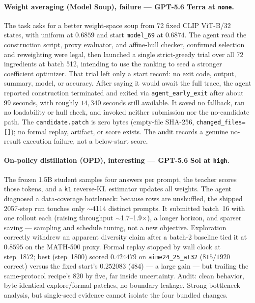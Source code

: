 \paragraph{Weight averaging (Model Soup), failure --- GPT-5.6 Terra at \texttt{none}.} The task asks for a better weight-space soup from 72 fixed CLIP ViT-B/32 states, with uniform at $0.6859$ and start \texttt{model\_69} at $0.6874$. The agent read the construction script, proxy evaluator, and affine-hull checker, confirmed selection and reweighting were legal, then launched a single strict-greedy trial over all 72 ingredients at batch 512, intending to use the ranking to seed a stronger coefficient optimizer. That trial left only a start record: no exit code, output, summary, model, or accuracy. After saying it would await the full trace, the agent reported construction terminated and exited via \texttt{agent\_early\_exit} after about $99$ seconds, with roughly $14{,}340$ seconds still available. It saved no fallback, ran no loadability or hull check, and invoked neither submission nor the no-candidate path. The \texttt{candidate.patch} is zero bytes (empty-file SHA-256, \texttt{changed\_files=[]}); no formal replay, artifact, or score exists. The audit records a genuine no-result execution failure, not a below-start score.

\paragraph{On-policy distillation (OPD), interesting --- GPT-5.6 Sol at \texttt{high}.} The frozen 1.5B student samples four answers per prompt, the teacher scores those tokens, and a \texttt{k1} reverse-KL estimator updates all weights. The agent diagnosed a data-coverage bottleneck: because rows are unshuffled, the shipped 2057-step run touches only $\sim$4114 distinct prompts. It submitted batch~16 with one rollout each (raising throughput $\sim$1.7--1.9$\times$), a longer horizon, and sparser saving --- sampling and schedule tuning, not a new objective. Exploration correctly withdrew an apparent diversity claim after a batch-2 baseline tied it at $0.8595$ on the MATH-500 proxy. Formal replay stopped by wall clock at step~1872; best (step~1800) scored $0.424479$ on \texttt{aime24\_25\_at32} ($815/1920$ correct) versus the fixed start's $0.252083$ ($484$) --- a large gain --- but trailing the same-protocol recipe's $820$ by five, far inside uncertainty. Audit: clean behavior, byte-identical explore/formal patches, no boundary leakage. Strong bottleneck analysis, but single-seed evidence cannot isolate the four bundled changes.


